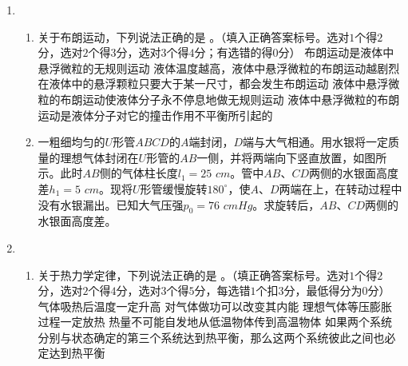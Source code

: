 \begin{enumerate}[leftmargin=0em]
\newpage
\item 
{}
\begin{enumerate}
\renewcommand{\labelenumi}{\arabic{enumi}.}
\item
关于布朗运动，下列说法正确的是  
。（填入正确答案标号。选对$ 1 $个得$ 2 $分，选对$ 2 $个得$ 3 $分，选对$ 3 $个得$ 4 $分；有选错的得$ 0 $分）
\fivechoices
{布朗运动是液体中悬浮微粒的无规则运动}
{液体温度越高，液体中悬浮微粒的布朗运动越剧烈}
{在液体中的悬浮颗粒只要大于某一尺寸，都会发生布朗运动}
{液体中悬浮微粒的布朗运动使液体分子永不停息地做无规则运动}
{液体中悬浮微粒的布朗运动是液体分子对它的撞击作用不平衡所引起的}

\item 
一粗细均匀的$ U $形管$ ABCD $的$ A $端封闭，$ D $端与大气相通。用水银将一定质量的理想气体封闭在$ U $形管的$ AB $一侧，并将两端向下竖直放置，如图所示。此时$ AB $侧的气体柱长度$ l_1=25 $ $ cm $。管中$ AB $、$ CD $两侧的水银面高度差$ h_1=5 $ $ cm $。现将$ U $形管缓慢旋转$ 180 ^{ \circ } $，使$ A $、$ D $两端在上，在转动过程中没有水银漏出。已知大气压强$ p_0=76 $ $ cmHg $。求旋转后，$ AB $、$ CD $两侧的水银面高度差。
\begin{figure}[h!]
\flushright

\end{figure}






\end{enumerate}


\newpage
\item 
{}
\begin{enumerate}
\renewcommand{\labelenumi}{\arabic{enumi}.}
\item
关于热力学定律，下列说法正确的是  
。（填正确答案标号。选对$ 1 $个得$ 2 $分，选对$ 2 $个得$ 4 $分，选对$ 3 $个得$ 5 $分，每选错$ 1 $个扣$ 3 $分，最低得分为$ 0 $分）
\fivechoices
{气体吸热后温度一定升高}
{对气体做功可以改变其内能}
{理想气体等压膨胀过程一定放热}
{热量不可能自发地从低温物体传到高温物体}
{如果两个系统分别与状态确定的第三个系统达到热平衡，那么这两个系统彼此之间也必定达到热平衡}


\end{enumerate}
\end{enumerate}
